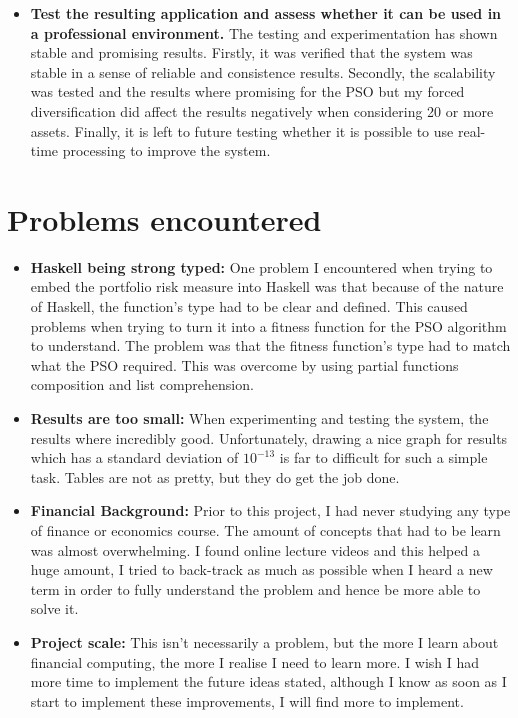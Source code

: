 \begin{itemize}
    \item \textbf{Test the resulting application and assess whether it can be used in a professional environment.} The testing and experimentation has shown stable and promising results. Firstly, it was verified that the system was stable in a sense of reliable and consistence results. Secondly, the scalability was tested and the results where promising for the PSO but my forced diversification did affect the results negatively when considering 20 or more assets. Finally, it is left to future testing whether it is possible to use real-time processing to improve the system.
  \end{itemize}

  \section{Problems encountered} %
  \label{sec:problems_encountered}
    \begin{itemize}
      \item \textbf{Haskell being strong typed:} One problem I encountered when trying to embed the portfolio risk measure into Haskell was that because of the nature of Haskell, the function's type had to be clear and defined. This caused problems when trying to turn it into a fitness function for the PSO algorithm to understand. The problem was that the fitness function's type had to match what the PSO required. This was overcome by using partial functions composition and list comprehension. 
      \item \textbf{Results are too small:} When experimenting and testing the system, the results where incredibly good. Unfortunately, drawing a nice graph for results which has a standard deviation of $10^{-13}$ is far to difficult for such a simple task. Tables are not as pretty, but they do get the job done. 
      \item \textbf{Financial Background:} Prior to this project, I had never studying any type of finance or economics course. The amount of concepts that had to be learn was almost overwhelming. I found online lecture videos and this helped a huge amount, I tried to back-track as much as possible when I heard a new term in order to fully understand the problem and hence be more able to solve it.
      \item \textbf{Project scale:} This isn't necessarily a problem, but the more I learn about financial computing, the more I realise I need to learn more. I wish I had more time to implement the future ideas stated, although I know as soon as I start to implement these improvements, I will find more to implement.
    \end{itemize}

